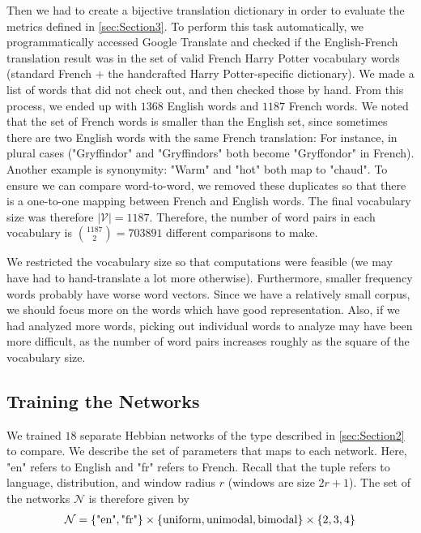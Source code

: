\documentclass[12pt, usenames]{article}
\theoremstyle{definition}
\theoremstyle{definition}
\theoremstyle{definition}
\newcommand{\txt}[1]
{\textnormal{#1}}
\newcommand{\mc}[1]
{\mathcal{#1}}
\begin{document}
Then we had to create a bijective translation dictionary in order to evaluate the metrics defined in \autoref{sec:Section3}. To perform this task automatically, we programmatically accessed Google Translate and checked if the English-French translation result was in the set of valid French Harry Potter vocabulary words (standard French $+$ the handcrafted Harry Potter-specific dictionary). We made a list of words that did not check out, and then checked those by hand. From this process, we ended up with $1368$ English words and $1187$ French words. We noted that the set of French words is smaller than the English set, since sometimes there are two English words with the same French translation: For instance, in plural cases ("Gryffindor" and "Gryffindors" both become "Gryffondor" in French). Another example is synonymity: "Warm" and "hot" both map to "chaud". To ensure we can compare word-to-word, we removed these duplicates so that there is a one-to-one mapping between French and English words. The final vocabulary size was therefore $|\mc{V}| = 1187$. Therefore, the number of word pairs in each vocabulary is ${1187 \choose 2} = 703891$ different comparisons to make. 

We restricted the vocabulary size so that computations were feasible (we may have had to hand-translate a lot more otherwise). Furthermore, smaller frequency words probably have worse word vectors. Since we have a relatively small corpus, we should focus more on the words which have good representation. Also, if we had analyzed more words, picking out individual words to analyze may have been more difficult, as the number of word pairs increases roughly as the square of the vocabulary size. 

\subsection{Training the Networks}

We trained $18$ separate Hebbian networks of the type described in \autoref{sec:Section2} to compare. We describe the set of parameters that maps to each network. Here, "en" refers to English and "fr" refers to French. Recall that the tuple refers to language, distribution, and window radius $r$ (windows are size $2r + 1$). The set of the networks $\mc{N}$ is therefore given by 
\begin{align}
\mc{N} = \{\txt{"en"}, \txt{"fr"}\} \times \{\txt{uniform}, \txt{unimodal}, \txt{bimodal}\} \times \{2, 3, 4\}
\end{align}
\end{document}
